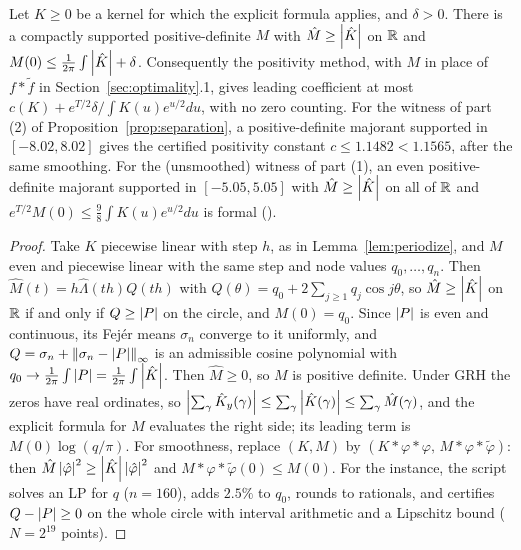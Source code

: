 \begin{proposition}\label{prop:majorant}
Let $K\ge0$ be a kernel for which the explicit formula applies, and $\delta>0$. There is a compactly supported positive-definite $M$ with
$\hat M\ge\left\lvert \hat K \right\rvert$ on $\mathbb{R}$ and $M(0)\le\frac1{2\pi}\int\left\lvert \hat K \right\rvert+\delta$. Consequently the positivity method, with $M$ in place of
$f*\tilde f$ in Section~\ref{sec:optimality}.1, gives leading coefficient at most $c(K)+e^{T/2}\delta/\int K(u)e^{u/2}du$, with no zero counting.
For the witness of part (2) of Proposition~\ref{prop:separation}, a positive-definite majorant supported in $[-8.02,8.02]$ gives the
certified positivity constant $c\le1.1482<1.1565$, after the same smoothing. For the (unsmoothed) witness of part (1), an even
positive-definite majorant supported in $[-5.05,5.05]$ with $\hat M\ge\left\lvert \hat K \right\rvert$ on all of $\mathbb{R}$ and $e^{T/2}M(0)\le\frac98\int K(u)e^{u/2}du$ is
formal ().
\end{proposition}
\begin{proof}
Take $K$ piecewise linear with step $h$, as in Lemma~\ref{lem:periodize}, and $M$ even and piecewise linear with the same step and node
values $q_0,\dots,q_n$. Then $\hat M(t)=h\hat\Lambda(th)Q(th)$ with $Q(\theta)=q_0+2\sum_{j\ge1}q_j\cos j\theta$, so $\hat M\ge\left\lvert \hat K \right\rvert$ on $\mathbb{R}$ if and only if
$Q\ge\left\lvert P \right\rvert$ on the circle, and $M(0)=q_0$. Since $\left\lvert P \right\rvert$ is even and continuous, its Fej\'er means $\sigma_n$ converge to it uniformly, and
$Q=\sigma_n+\left\lVert \sigma_n-\left\lvert P \right\rvert \right\rVert_\infty$ is an admissible cosine polynomial with $q_0\to\frac1{2\pi}\int\left\lvert P \right\rvert=\frac1{2\pi}\int\left\lvert \hat K \right\rvert$. Then $\hat M\ge0$, so $M$ is
positive definite. Under GRH the zeros have real ordinates, so $\left\lvert \sum_\gamma\hat K_y(\gamma) \right\rvert\le\sum_\gamma\left\lvert \hat K(\gamma) \right\rvert\le\sum_\gamma\hat M(\gamma)$, and the
explicit formula for $M$ evaluates the right side; its leading term is $M(0)\log(q/\pi)$. For smoothness, replace $(K,M)$ by
$(K*\varphi*\varphi,\,M*\varphi*\tilde\varphi)$: then $\hat M\left\lvert \hat\varphi \right\rvert^2\ge\left\lvert \hat K \right\rvert\left\lvert \hat\varphi \right\rvert^2$ and $M*\varphi*\tilde\varphi(0)\le M(0)$. For the instance, the script solves an
LP for $q$ ($n=160$), adds $2.5\%$ to $q_0$, rounds to rationals, and certifies $Q-\left\lvert P \right\rvert\ge0$ on the whole circle with interval arithmetic and a
Lipschitz bound ($N=2^{19}$ points).
\end{proof}


